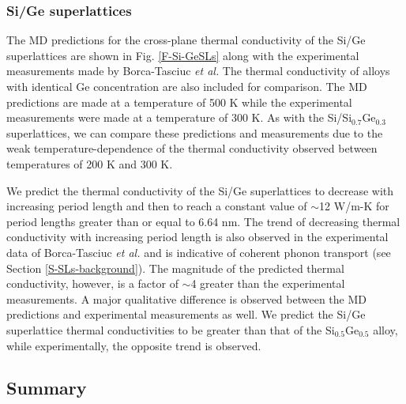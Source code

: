 \documentclass[letterpaper,12pt]{article}
\begin{document}
\subsubsection*{Si/Ge superlattices}
%

The MD predictions for the cross-plane thermal conductivity of the
Si/Ge superlattices are shown in Fig$.$ \ref{F-Si-GeSLs} along with
the experimental measurements made by Borca-Tasciuc \textit{et
al.}\cite{borca-tasciuc2000} The thermal conductivity of alloys with
identical Ge concentration are also included for
comparison.\cite{lee1997} The MD predictions are made at a
temperature of 500 K while the experimental measurements were made
at a temperature of 300 K. As with the Si/Si$_{0.7}$Ge$_{0.3}$
superlattices, we can compare these predictions and measurements due
to the weak temperature-dependence of the thermal conductivity
observed between temperatures of 200 K and 300
K.\cite{borca-tasciuc2000}

We predict the thermal conductivity of the Si/Ge superlattices to
decrease with increasing period length and then to reach a constant
value of $\sim$12 W/m-K for period lengths greater than or equal to
6.64 nm. The trend of decreasing thermal conductivity with
increasing period length is also observed in the experimental data
of Borca-Tasciuc \textit{et al.} and is indicative of coherent
phonon transport (see Section \ref{S-SLs-background}). The magnitude
of the predicted thermal conductivity, however, is a factor of
$\sim$4 greater than the experimental measurements. A major
qualitative difference is observed between the MD predictions and
experimental measurements as well. We predict the Si/Ge superlattice
thermal conductivities to be greater than that of the
Si$_{0.5}$Ge$_{0.5}$ alloy, while experimentally, the opposite trend
is observed.

\subsection{\label{S-validation-justification}Summary}
\end{document}
